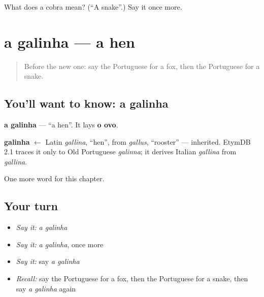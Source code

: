 \begin{tcolorbox}[breakable,colback=teal!4,colframe=teal!35!black,title={Before you move on}]
What does a cobra mean? (\textquotedblleft{}A snake\textquotedblright{}.) Say it once more.
\end{tcolorbox}
\section[a galinha]{a galinha — a hen}

\label{lesson:PT-C62-galinha}



\begin{quote}
Before the new one: say the Portuguese for a fox, then the Portuguese for a snake.
\end{quote}

\subsection*{You'll want to know: a galinha}
\textbf{a galinha} — \textquotedblleft{}a hen\textquotedblright{}. It lays \textbf{o ovo}.

\begin{cousinweb}
\textbf{galinha} $\leftarrow$ Latin \emph{gallina}, \textquotedblleft{}hen\textquotedblright{}, from \emph{gallus}, \textquotedblleft{}rooster\textquotedblright{} — inherited. EtymDB 2.1 traces it only to Old Portuguese \emph{galinna}; it derives Italian \emph{gallina} from \emph{gallina}.
\end{cousinweb}

\begin{grammarlens}[title={What you've built}]
One more word for this chapter.
\end{grammarlens}

\subsection*{Your turn}
\begin{itemize}
\raggedright
  \item \emph{Say it:} \emph{a galinha}
  \item \emph{Say it:} \emph{a galinha}, once more
  \item \emph{Say it:} say \emph{a galinha}
  \item \emph{Recall:} say the Portuguese for a fox, then the Portuguese for a snake, then say \emph{a galinha} again
\end{itemize}

